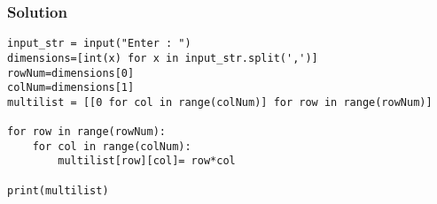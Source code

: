 \begin{frame}[fragile]\frametitle{Solution}
  \begin{lstlisting}
input_str = input("Enter : ")
dimensions=[int(x) for x in input_str.split(',')]
rowNum=dimensions[0]
colNum=dimensions[1]
multilist = [[0 for col in range(colNum)] for row in range(rowNum)]

for row in range(rowNum):
    for col in range(colNum):
        multilist[row][col]= row*col

print(multilist)
  \end{lstlisting}
\end{frame}
%
%
%
%
